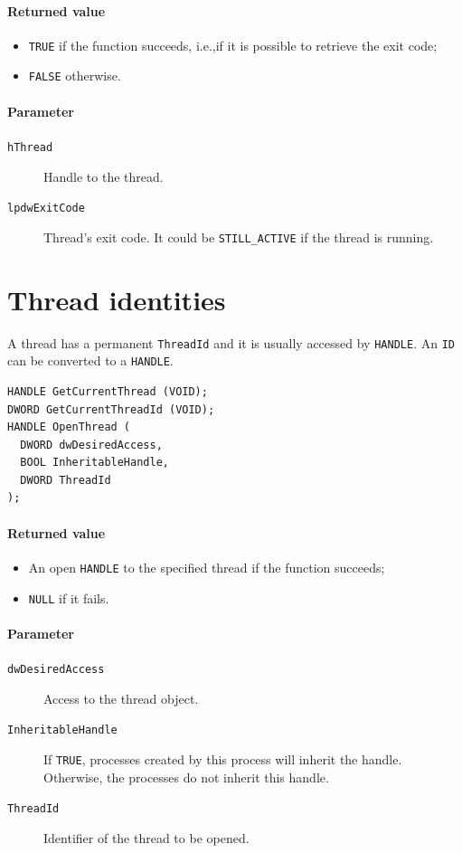 \paragraph{Returned value}
\begin{itemize}
\item \texttt{TRUE} if the function succeeds, i.e.,\@ if it is possible to retrieve the exit code;
\item \texttt{FALSE} otherwise.
\end{itemize}

\paragraph{Parameter}
\begin{description}
\item [\texttt{hThread}] Handle to the thread.
\item [\texttt{lpdwExitCode}] Thread's exit code. It could be \texttt{STILL\_ACTIVE} if the thread is running.
\end{description}

\section{Thread identities}
A thread has a permanent \texttt{ThreadId} and it is usually accessed by \texttt{HANDLE}. An \texttt{ID} can be converted to a \texttt{HANDLE}.

\begin{verbatim}
HANDLE GetCurrentThread (VOID);
DWORD GetCurrentThreadId (VOID);
HANDLE OpenThread (
  DWORD dwDesiredAccess,
  BOOL InheritableHandle,
  DWORD ThreadId
);
\end{verbatim}

\paragraph{Returned value}
\begin{itemize}
\item An open \texttt{HANDLE} to the specified thread if the function succeeds;
\item \texttt{NULL} if it fails.
\end{itemize}

\paragraph{Parameter}
\begin{description}
\item [\texttt{dwDesiredAccess}] Access to the thread object.
\item [\texttt{InheritableHandle}] If \texttt{TRUE}, processes created by this process will inherit the handle. Otherwise, the processes do not inherit this handle.
\item [\texttt{ThreadId}] Identifier of the thread to be opened.
\end{description}

